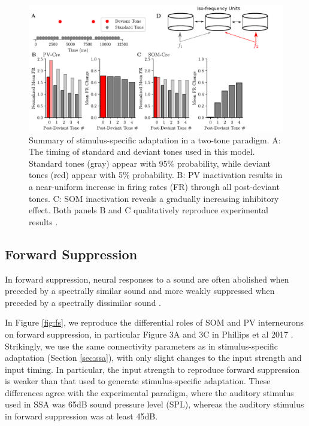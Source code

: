 \documentclass[a4paper,10pt]{article}
\begin{document}
\begin{figure}[ht!]
 \centering
 \includegraphics[width=\textwidth]{ssa.pdf}
 \caption{Summary of stimulus-specific adaptation in a two-tone paradigm. A: The timing of standard and deviant tones used in this model. Standard tones (gray) appear with 95\% probability, while deviant tones (red) appear with 5\% probability. B: PV inactivation results in a near-uniform increase in firing rates (FR) through all post-deviant tones. C: SOM inactivation reveals a gradually increasing inhibitory effect. Both panels B and C qualitatively reproduce experimental results \cite{natan2015complementary}.}
\end{figure}


\subsection{Forward Suppression}

In forward suppression, neural responses to a sound are often abolished when preceded by a spectrally similar sound and more weakly suppressed when preceded by a spectrally dissimilar sound \cite{phillips2017cortical,phillips2017diverse}.

In Figure \ref{fig:fs}, we reproduce the differential roles of SOM and PV interneurons on forward suppression, in particular Figure 3A and 3C in Phillips et al 2017 \cite{phillips2017cortical}. Strikingly, we use the same connectivity parameters as in stimulus-specific adaptation (Section \ref{sec:ssa}), with only slight changes to the input strength and input timing. In particular, the input strength to reproduce forward suppression is weaker than that used to generate stimulus-specific adaptation. These differences agree with the experimental paradigm, where the auditory stimulus used in SSA was 65dB sound pressure level (SPL), whereas the auditory stimulus in forward suppression was at least 45dB.
\end{document}
